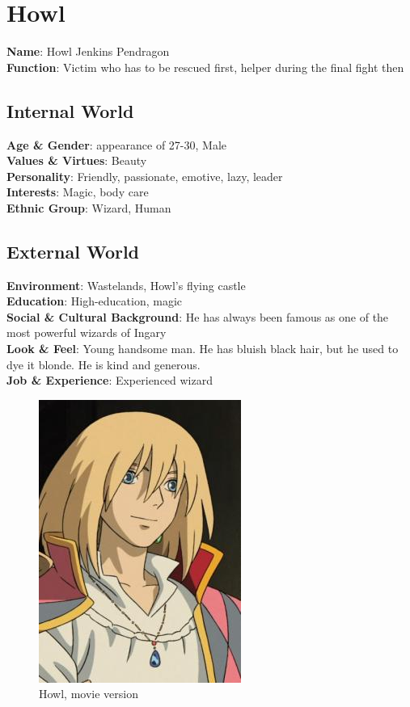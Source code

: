 \section{Howl}

\begin{minipage}{0.5\textwidth}
\textbf{Name}: Howl Jenkins Pendragon \\
\textbf{Function}: Victim who has to be rescued first, helper during the final fight then

\subsection{Internal World}

\textbf{Age \& Gender}: appearance of 27-30, Male \\
\textbf{Values \& Virtues}: Beauty \\
\textbf{Personality}: Friendly, passionate, emotive, lazy, leader \\
\textbf{Interests}: Magic, body care \\
\textbf{Ethnic Group}: Wizard, Human

\subsection{External World}
\textbf{Environment}: Wastelands, Howl's flying castle \\
\textbf{Education}: High-education, magic \\
\textbf{Social \& Cultural Background}: He has always been famous as one of the most powerful wizards of Ingary \\
\textbf{Look \& Feel}: Young handsome man. He has bluish black hair, but he used to dye it blonde. He is kind and generous. \\
\textbf{Job \& Experience}: Experienced wizard \\

\end{minipage}%
%
\hfill\begin{minipage}{0.4\textwidth}
  \begin{figure}[H]
    \hfill\includegraphics{Images/Characters/howl}
    \caption{Howl, movie version}
  \end{figure}
\end{minipage}


